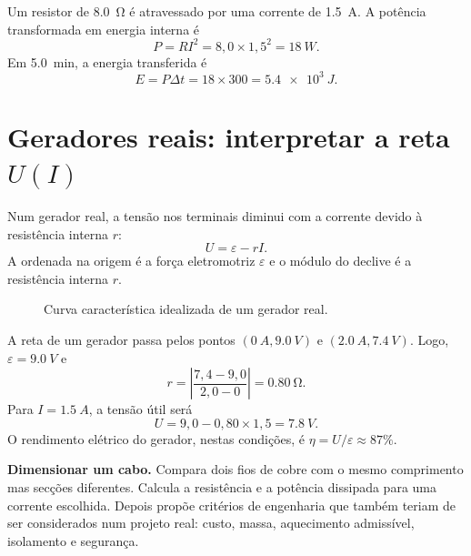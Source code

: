 \documentclass[11pt,a4paper,oneside]{book}
\begin{document}
\begin{exemplo}[title=Exemplo resolvido -- potência dissipada]
Um resistor de \SI{8.0}{\ohm} é atravessado por uma corrente de \SI{1.5}{A}. A potência transformada em energia interna é
\[
P=RI^2=8{,}0\times1{,}5^2=\SI{18}{W}.
\]
Em \SI{5.0}{min}, a energia transferida é
\[
E=P\Delta t=18\times300=\SI{5.4e3}{J}.
\]
\end{exemplo}

\section{Geradores reais: interpretar a reta $U(I)$}
Num gerador real, a tensão nos terminais diminui com a corrente devido à resistência interna $r$:
\[
U=\varepsilon-rI.
\]
A ordenada na origem é a força eletromotriz $\varepsilon$ e o módulo do declive é a resistência interna $r$.

\begin{figure}[H]
\centering
{}
\caption{Curva característica idealizada de um gerador real.}
\end{figure}

\begin{exemplo}[title=Exemplo resolvido -- força eletromotriz e resistência interna]
A reta de um gerador passa pelos pontos $(\SI{0}{A},\SI{9.0}{V})$ e $(\SI{2.0}{A},\SI{7.4}{V})$. Logo, $\varepsilon=\SI{9.0}{V}$ e
\[
r=\left|\frac{7{,}4-9{,}0}{2{,}0-0}\right|=\SI{0.80}{\ohm}.
\]
Para $I=\SI{1.5}{A}$, a tensão útil será
\[
U=9{,}0-0{,}80\times1{,}5=\SI{7.8}{V}.
\]
O rendimento elétrico do gerador, nestas condições, é $\eta=U/\varepsilon\approx87\%$.
\end{exemplo}

\begin{stem}
\textbf{Dimensionar um cabo.} Compara dois fios de cobre com o mesmo comprimento mas secções diferentes. Calcula a resistência e a potência dissipada para uma corrente escolhida. Depois propõe critérios de engenharia que também teriam de ser considerados num projeto real: custo, massa, aquecimento admissível, isolamento e segurança.
\end{stem}
\end{document}
